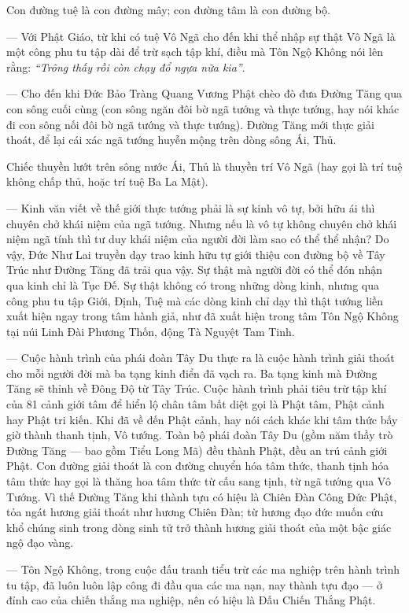 Con đường tuệ là con đường mây; con đường tâm là con đường bộ.

— Với Phật Giáo, từ khi có tuệ Vô Ngã cho đến khi thể nhập sự thật Vô Ngã là một công phu tu tập dài để trừ sạch tập khí, điều mà Tôn Ngộ Không nói lên rằng: \emph{``Trông thấy rồi còn chạy đổ ngựa nữa kia''}.

— Cho đến khi Đức Bảo Tràng Quang Vương Phật chèo đò đưa Đường Tăng qua con sông cuối cùng (con sông ngăn đôi bờ ngã tướng và thực tướng, hay nói khác đi con sông nối đôi bờ ngã tướng và thực tướng). Đường Tăng mới thực giải thoát, để lại cái xác ngã tướng huyễn mộng trên dòng sông Ái, Thủ.

Chiếc thuyền lướt trên sông nước Ái, Thủ là thuyền trí Vô Ngã (hay gọi là trí tuệ không chấp thủ, hoặc trí tuệ Ba La Mật).

— Kinh văn viết về thế giới thực tướng phải là sự kinh vô tự, bởi hữu ái thì chuyên chở khái niệm của ngã tướng. Nhưng nếu là vô tự không chuyên chở khái niệm ngã tính thì tư duy khái niệm của người đời làm sao có thể thể nhận? Do vậy, Đức Như Lai truyền dạy trao kinh hữu tự giới thiệu con đường bộ về Tây Trúc như Đường Tăng đã trải qua vậy. Sự thật mà người đời có thể đón nhận qua kinh chỉ là Tục Đế. Sự thật không có trong những dòng kinh, nhưng qua công phu tu tập Giới, Định, Tuệ mà các dòng kinh chỉ dạy thì thật tướng liền xuất hiện ngay trong tâm hành giả, như đã xuất hiện trong tâm Tôn Ngộ Không tại núi Linh Đài Phương Thốn, động Tà Nguyệt Tam Tinh.

— Cuộc hành trình của phái đoàn Tây Du thực ra là cuộc hành trình giải thoát cho mỗi người đời mà ba tạng kinh điển đã vạch ra. Ba tạng kinh mà Đường Tăng sẽ thỉnh về Đông Độ từ Tây Trúc. Cuộc hành trình phải tiêu trừ tập khí của 81 cảnh giới tâm để hiển lộ chân tâm bất diệt gọi là Phật tâm, Phật cảnh hay Phật tri kiến. Khi đã về đến Phật cảnh, hay nói cách khác khi tâm thức bấy giờ thành thanh tịnh, Vô tướng. Toàn bộ phái đoàn Tây Du (gồm năm thầy trò Đường Tăng — bao gồm Tiểu Long Mã) đều thành Phật, đều an trú cảnh giới Phật. Con đường giải thoát là con đường chuyển hóa tâm thức, thanh tịnh hóa tâm thức hay gọi là thăng hoa tâm thức từ cấu sang tịnh, từ ngã tướng qua Vô Tướng. Vì thế Đường Tăng khi thành tựu có hiệu là Chiên Đàn Công Đức Phật, tỏa ngát hương giải thoát như hương Chiên Đàn; từ hương đạo đức muốn cứu khổ chúng sinh trong dòng sinh tử trở thành hương giải thoát của một bậc giác ngộ đạo vàng.

— Tôn Ngộ Không, trong cuộc đấu tranh tiểu trừ các ma nghiệp trên hành trình tu tập, đã luôn luôn lập công đi đầu qua các ma nạn, nay thành tựu đạo — ở đỉnh cao của chiến thắng ma nghiệp, nên có hiệu là Đấu Chiến Thắng Phật.

